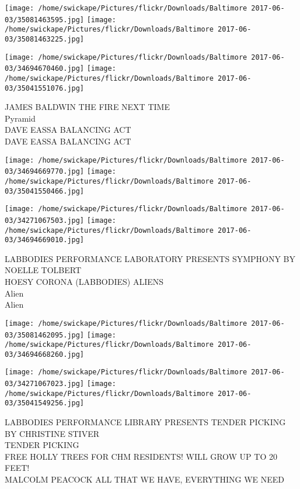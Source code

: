 \documentclass[10pt,letterpaper]{article}
\begin{document}
\texttt{[image: /home/swickape/Pictures/flickr/Downloads/Baltimore 2017-06-03/35081463595.jpg]}
\texttt{[image: /home/swickape/Pictures/flickr/Downloads/Baltimore 2017-06-03/35081463225.jpg]}

\texttt{[image: /home/swickape/Pictures/flickr/Downloads/Baltimore 2017-06-03/34694670460.jpg]}
\texttt{[image: /home/swickape/Pictures/flickr/Downloads/Baltimore 2017-06-03/35041551076.jpg]}

JAMES BALDWIN THE FIRE NEXT TIME\\
Pyramid\\
DAVE EASSA BALANCING ACT\\
DAVE EASSA BALANCING ACT\\
\pagebreak

\texttt{[image: /home/swickape/Pictures/flickr/Downloads/Baltimore 2017-06-03/34694669770.jpg]}
\texttt{[image: /home/swickape/Pictures/flickr/Downloads/Baltimore 2017-06-03/35041550466.jpg]}

\texttt{[image: /home/swickape/Pictures/flickr/Downloads/Baltimore 2017-06-03/34271067503.jpg]}
\texttt{[image: /home/swickape/Pictures/flickr/Downloads/Baltimore 2017-06-03/34694669010.jpg]}

LABBODIES PERFORMANCE LABORATORY PRESENTS SYMPHONY BY NOELLE TOLBERT\\
HOESY CORONA (LABBODIES) ALIENS\\
Alien\\
Alien\\
\pagebreak

\texttt{[image: /home/swickape/Pictures/flickr/Downloads/Baltimore 2017-06-03/35081462095.jpg]}
\texttt{[image: /home/swickape/Pictures/flickr/Downloads/Baltimore 2017-06-03/34694668260.jpg]}

\texttt{[image: /home/swickape/Pictures/flickr/Downloads/Baltimore 2017-06-03/34271067023.jpg]}
\texttt{[image: /home/swickape/Pictures/flickr/Downloads/Baltimore 2017-06-03/35041549256.jpg]}

LABBODIES PERFORMANCE LIBRARY PRESENTS TENDER PICKING BY CHRISTINE STIVER\\
TENDER PICKING\\
FREE HOLLY TREES FOR CHM RESIDENTS!  WILL GROW UP TO 20 FEET!\\
MALCOLM PEACOCK ALL THAT WE HAVE, EVERYTHING WE NEED\\
\pagebreak
\end{document}
